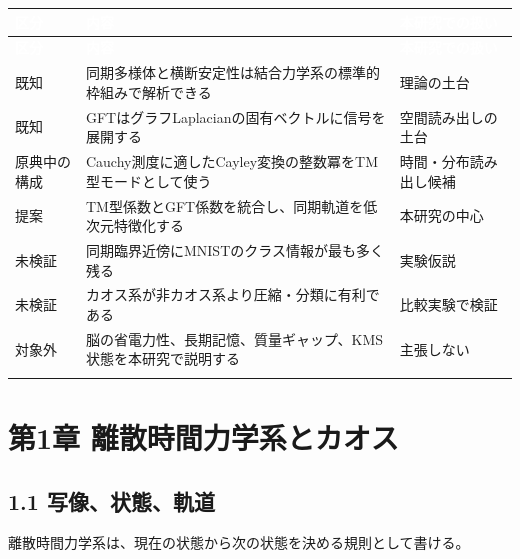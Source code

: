 \documentclass[11pt,a4paper]{ltjsarticle}
\renewcommand{\arraystretch}{1.25}
\begin{document}
\begingroup
\small
\renewcommand{\arraystretch}{1.35}
\begin{longtable}{@{}>{\raggedright\arraybackslash}p{}>{\raggedright\arraybackslash}p{}>{\raggedright\arraybackslash}p{}@{}}
\rowcolor{researchink}
\textcolor{white}{\textbf{区分}} & \textcolor{white}{\textbf{内容}} & \textcolor{white}{\textbf{本研究での扱い}} \\
\endfirsthead
\rowcolor{researchink}
\textcolor{white}{\textbf{区分}} & \textcolor{white}{\textbf{内容}} & \textcolor{white}{\textbf{本研究での扱い}} \\
\endhead
既知 & 同期多様体と横断安定性は結合力学系の標準的枠組みで解析できる & 理論の土台 \\
\addlinespace[2pt]
\rowcolor{researchpale}
既知 & GFTはグラフLaplacianの固有ベクトルに信号を展開する & 空間読み出しの土台 \\
\addlinespace[2pt]
原典中の構成 & Cauchy測度に適したCayley変換の整数冪をTM型モードとして使う & 時間・分布読み出し候補 \\
\addlinespace[2pt]
\rowcolor{researchpale}
提案 & TM型係数とGFT係数を統合し、同期軌道を低次元特徴化する & 本研究の中心 \\
\addlinespace[2pt]
未検証 & 同期臨界近傍にMNISTのクラス情報が最も多く残る & 実験仮説 \\
\addlinespace[2pt]
\rowcolor{researchpale}
未検証 & カオス系が非カオス系より圧縮・分類に有利である & 比較実験で検証 \\
\addlinespace[2pt]
対象外 & 脳の省電力性、長期記憶、質量ギャップ、KMS状態を本研究で説明する & 主張しない \\
\addlinespace[2pt]
\end{longtable}
\endgroup

\goodbreak

\section*{\textcolor{researchink}{第1章 離散時間力学系とカオス}}


\subsection*{\textcolor{researchblue}{1.1 写像、状態、軌道}}

離散時間力学系は、現在の状態から次の状態を決める規則として書ける。\par
\end{document}
